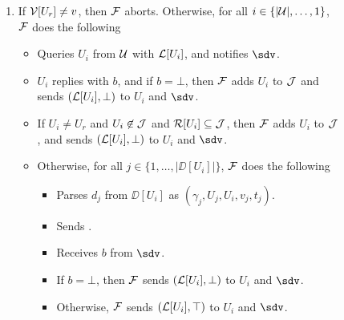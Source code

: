 \begin{figure*}[!t]
{{\begin{enumerate}
	\item If $\mathcal{V}[U_r] \neq v$, then $\mathcal{F}$ aborts. Otherwise, for all $i \in \{|\mathcal{U}|,\ldots,1\}$, 
	$\mathcal{F}$ does the following
	\begin{itemize}[label=-]
		\item Queries $U_i$ from $\mathcal{U}$ with $\mathcal{L}[U_i]$, and notifies $\sdv$.
		\item $U_i$ replies with $b$, and if $b = \bot$, then $\mathcal{F}$ adds $U_i$ to $\mathcal{J}$ and sends
		$(\mathcal{L}[U_i],\bot)$ to $U_i$ and $\sdv$. 
		\item If $U_i \neq U_r$ and $U_i \not\in \mathcal{J}$ and $\mathcal{R}[U_i] \subseteq \mathcal{J}$, then $\mathcal{F}$ adds $U_i$ to $\mathcal{J}$, 
		and sends $(\mathcal{L}[U_i],\bot)$ to $U_i$ and $\sdv$.
		\item Otherwise, for all $j \in \{1,\ldots,|\DD[U_i]|\}$, $\mathcal{F}$ does the following
		\begin{itemize}[label=$\circ$]
			\item Parses $d_j$ from $\DD[U_i]$ as $(\gamma_j,U_j,U_i,v_j,t_j)$.
			\item Sends .
			\item Receives $b$ from $\sdv$.
			\item If $b = \bot$, then $\mathcal{F}$ sends $(\mathcal{L}[U_i], \bot)$ to $U_i$ and $\sdv$.
			\item Otherwise, $\mathcal{F}$ sends $(\mathcal{L}[U_i], \top)$ to $U_i$ and $\sdv$.
		\end{itemize}
	\end{itemize}
	

\end{enumerate}}}
\end{figure*}

